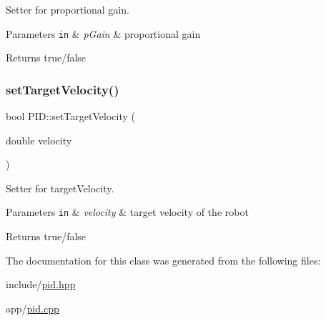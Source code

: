 Setter for proportional gain. 


\begin{DoxyParams}[1]{Parameters}
\mbox{\tt in}  & {\em p\+Gain} & proportional gain \\
\hline
\end{DoxyParams}
\begin{DoxyReturn}{Returns}
true/false 
\end{DoxyReturn}
\mbox{\label{classPID_a430bbe62eb2f904eb45ce081d96dc294}} 
\subsubsection{\texorpdfstring{set\+Target\+Velocity()}{setTargetVelocity()}}
{\footnotesize\ttfamily bool P\+I\+D\+::set\+Target\+Velocity (\begin{DoxyParamCaption}\item[{double}]{velocity }\end{DoxyParamCaption})}



Setter for target\+Velocity. 


\begin{DoxyParams}[1]{Parameters}
\mbox{\tt in}  & {\em velocity} & target velocity of the robot \\
\hline
\end{DoxyParams}
\begin{DoxyReturn}{Returns}
true/false 
\end{DoxyReturn}


The documentation for this class was generated from the following files\+:\begin{DoxyCompactItemize}
\item 
include/\hyperlink{pid_8hpp}{pid.\+hpp}\item 
app/\hyperlink{pid_8cpp}{pid.\+cpp}\end{DoxyCompactItemize}
